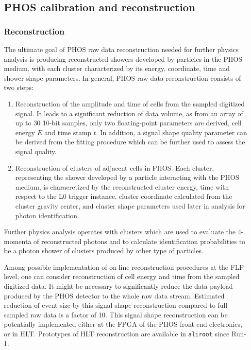 \subsection{PHOS calibration and reconstruction}
\label{PHOS:FLP}

\subsubsection{Reconstruction}

The ultimate goal of PHOS raw data reconstruction needed for further
physics analysis is producing reconstructed showers developed by
particles in the PHOS medium, with each cluster characterized by its
energy, coordinate, time and shower shape parameters. In general, PHOS
raw data reconstruction consists of two steps:
%
\begin{enumerate}
  \item Reconstruction of the amplitude and time of cells from the
    sampled digitized signal. It leads to a significant reduction of
    data volume, as from an array of up to 30 10-bit samples, only two
    floating-point parameters are derived, cell energy $E$ and time
    stamp $t$. In addition, a signal shape quality parameter can be
    derived from the fitting procedure which can be further used to
    assess the signal quality.
  \item Reconstruction of clusters of adjacent cells in PHOS. Each
    cluster, representing the shower developed by a particle
    interacting with the PHOS medium, is characretized by the
    reconstructed cluster energy, time with respect to the L0 trigger
    instance, cluster coordinate calculated from the cluster gravity
    center, and cluster shape parameters used later in analysis for
    photon identification.
\end{enumerate}
%
Further physics analysis operates with clusters which are used to
evaluate the 4-momenta of reconstructed photons and to calculate
identification probabilities to be a photon shower of clusters
produced by other type of particles.

Among possible implementation of on-line reconstruction procedures at
the FLP level, one can consider reconstruction of cell energy and time
from the sampled digitized data. It might be necessary to
significantly reduce the data payload produced by the PHOS detector to
the whole raw data stream. Estimated reduction of event size by this
signal shape reconstruction compared to full sampled raw data is a
factor of 10. This signal shape reconstruction can be potentially
implemented either at the FPGA of the PHOS front-end electronics, or
in HLT. Prototypes of HLT reconstruction are available in
\verb|aliroot| since Run-1.

